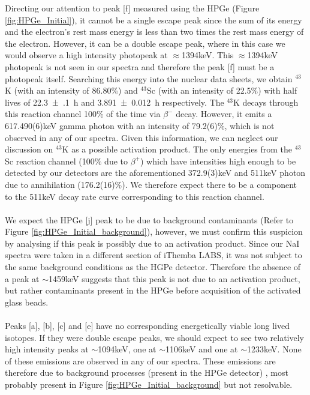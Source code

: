 \documentclass[]{article}
\begin{document}
Directing our attention to peak [f] measured using the HPGe (Figure \ref{fig:HPGe_Initial}), it cannot be a single escape peak since the sum of its energy and the electron's rest mass energy is less than two times the rest mass energy of the electron. However, it can be a double escape peak, where in this case we would observe a high intensity photopeak at $\approx$1394keV. This $\approx$1394keV photopeak is not seen in our spectra and therefore the peak [f] must be a photopeak itself. Searching this energy into the nuclear data sheets, we obtain ${}^{43}$K (with an intensity of 86.80$\%$) and ${}^{43}$Sc (with an intensity of 22.5$\%$) with half lives of \SI{22.3(1)}{\hour} and \SI{3.891(12)}{\hour} respectively. The ${}^{43}$K decays through this reaction channel 100$\%$ of the time via $\beta^-$ decay. However, it emits a 617.490(6)keV gamma photon with an intensity of 79.2(6)$\%$, which is not observed in any of our spectra. Given this information, we can neglect our discussion on ${}^{43}$K as a possible activation product. The only energies from the ${}^{43}$Sc reaction channel (100$\%$ due to $\beta^+$) which have intensities high enough to be detected by our detectors are the aforementioned 372.9(3)keV and 511keV photon due to annihilation (176.2(16)$\%$). We therefore expect there to be a component to the 511keV decay rate curve corresponding to this reaction channel.\\\\
We expect the HPGe [j] peak to be due to background contaminants (Refer to Figure \ref{fig:HPGe_Initial_background}), however, we must confirm this suspicion by analysing if this peak is possibly due to an activation product. Since our NaI spectra were taken in a different section of iThemba LABS, it was not subject to the same background conditions as the HGPe detector. Therefore the absence of a peak at $\sim$1459keV suggests that this peak is not due to an activation product, but rather contaminants present in the HPGe before acquisition of the activated glass beads.\\\\
Peaks [a], [b], [c] and [e] have no corresponding energetically viable long lived isotopes. If they were double escape peaks, we should expect to see two relatively high intensity peaks at $\sim$1094keV, one at $\sim$1106keV and one at $\sim$1233keV. None of these emissions are observed in any of our spectra. These emissions are therefore due to background processes (present in the HPGe detector) , most probably present in Figure \ref{fig:HPGe_Initial_background} but not resolvable.\\\\
\end{document}
